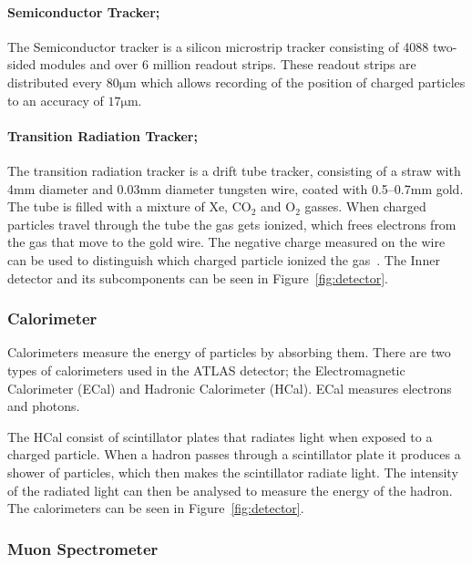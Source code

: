 \documentclass[12pt,a4paper]{article}
\numberwithin{equation}{section}
\begin{document}
\paragraph{Semiconductor Tracker;}
The Semiconductor tracker is a silicon microstrip tracker consisting of 4088
two-sided modules and over 6 million readout strips. These readout strips are
distributed every $80\mathrm{\mu m}$ which allows recording of the position of
charged particles to an accuracy of $17\mathrm{\mu m}$.

\paragraph{Transition Radiation Tracker;}
The transition radiation tracker is a drift tube tracker, consisting of a straw
with 4mm diameter and 0.03mm diameter tungsten wire, coated with 0.5--0.7mm gold.
The tube is filled with a mixture of Xe, $\mathrm{CO_2}$ and $\mathrm{O_2}$
gasses. When charged particles travel through the tube the gas gets ionized,
which frees electrons from the gas that move to the gold wire. The negative
charge measured on the wire can be used to distinguish which charged particle
ionized the gas~\cite{ATLAS-ID}. The Inner detector and its subcomponents can be
seen in Figure~\ref{fig:detector}.


\subsubsection{Calorimeter}
Calorimeters measure the energy of particles by absorbing them. There are two
types of calorimeters used in the ATLAS detector; the Electromagnetic
Calorimeter (ECal) and Hadronic Calorimeter (HCal). ECal measures electrons and photons.


The HCal consist of scintillator plates that radiates light when exposed to a
charged particle. When a hadron passes through a scintillator plate it produces
a shower of particles, which then makes the scintillator radiate light. The
intensity of the radiated light can then be analysed to measure the energy of
the hadron. The calorimeters can be seen in Figure~\ref{fig:detector}.\cite{detector-vid}


\subsubsection{Muon Spectrometer}
\end{document}
